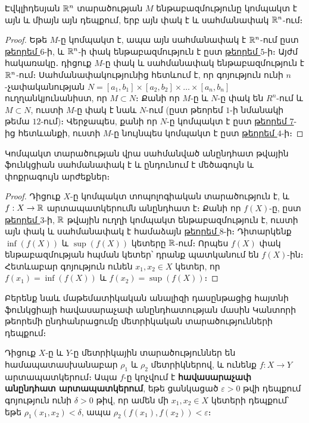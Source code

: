 \documentclass[./main.tex]{subfiles}
\begin{document}
\begin{theorem}\label{ch17thm8}\label{թեորեմ 8}
Էվկլիդեսյան $\mathbb{R}^n$ տարածության $M$ ենթաբազմությունը կոմպակտ է այն և միայն այն դեպքում, երբ այն փակ է և սահմանափակ $\mathbb{R}^n$-ում։
\end{theorem} %
\begin{proof}
Եթե $M$-ը կոմպակտ է, ապա այն սահմանափակ է $\mathbb{R}^n$-ում ըստ \hyperref[թեորեմ 6]{թեորեմ $6$}-ի, և $\mathbb{R}^n$-ի փակ ենթաբազմություն է ըստ \hyperref[թեորեմ 5]{թեորեմ $5$}-ի։ Այժմ հակառակը․ դիցուք $M$-ը փակ և սահմանափակ ենթաբազմություն է $\mathbb{R}^n$-ում։ Սահմանա\-փա\-կու\-թյունից հետևում է, որ գոյություն ունի $n$-չափականության $ N=[ a_1,b_1 ]\times [ a_2,b_2 ] \times \dots \times [ a_n,b_n ]$  ուղ\-ղանկ\-յու\-նա\-նիստ, որ $M\subset N$։  Քանի որ $M$-ը և $N$-ը փակ են $R^n$-ում և $M\subset N$, ուստի $M$-ը փակ է նաև $N$-ում (ըստ թեորեմ $1$-ի նմանակի թեմա $12$-ում)։ Վերջապես, քանի որ $N$-ը կոմպակտ է ըստ \hyperref[թեորեմ 7]{թեորեմ 7}-ից հետևանքի, ուստի $M$-ը նույնպես կոմպակտ է ըստ \hyperref[թեորեմ 4]{թեորեմ $4$}-ի։
\end{proof}
\begin{theorem}\label{ch17thm9} \label{թեորեմ 9} 
Կոմպակտ տարածության վրա սահմանված ան\-ընդ\-հատ թվային ֆունկցիան սահմանափակ է և ընդունում է մեծագույն և փոքրագույն արժեքներ։
\end{theorem} %

\begin{proof}
Դիցուք $X$-ը կոմպակտ տոպոլոգիական տարածություն է, և ${f:X\rightarrow \mathbb{R}}$ արտապատկերումն անընդհատ է։ Քանի որ $f(X)$-ը, ըստ \hyperref[թեորեմ 3]{թեորեմ $3$}-ի, $\mathbb{R}$ թվային ուղղի կոմպակտ ենթաբազմություն է, ուստի այն փակ և սահմանափակ է համաձայն \hyperref[թեորեմ 8]{թեորեմ $8$}-ի։ Դիտարկենք $\inf(f(X))$ և $\sup⁡(f(X))$ կետերը $\mathbb{R}$-ում։ Որպես $f(X)$ փակ ենթաբազմության հպման կետեր՝ դրանք պատկանում են $f(X)$-ին։ Հետևաբար գոյություն ունեն $x_1,x_2\in X$ կետեր, որ $f(x_1)=\inf(f(X))$ և $f(x_2)=\sup(f(X))$։ 
\end{proof}

\par Բերենք նաև մաթեմատիկական անալիզի դասընթացից հայտնի ֆունկցիայի հա\-վա\-սարաչափ անընդհատության մասին Կանտորի թեորեմի ընդհանրացումը մետ\-րի\-կա\-կան տարածությունների դեպքում։

\begin{definition}
Դիցուք $X$-ը և $Y$-ը մետրիկային տարածություններ են համա\-պա\-տաս\-խա\-նա\-բար $\rho_1$ և $\rho_2$ մետրիկներով, և ունենք $f: X \to Y$ արտապատկերում։ Ապա $f$-ը կոչվում է \textbf{հավասարաչափ անընդհատ արտապատկերում}, եթե ցանկացած $\varepsilon > 0$ թվի դեպքում գոյություն ունի $\delta > 0$ թիվ, որ ամեն մի $x_1, x_2 \in X$ կետերի դեպքում՝ եթե $\rho_1(x_1, x_2) < \delta$, ապա $\rho_2(f(x_1), f(x_2)) < \varepsilon$։
\end{definition}
\end{document}
